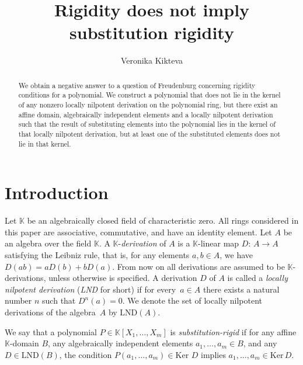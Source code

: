 \documentclass[12pt,reqno]{amsart}
\title{}
\author{Veronika Kikteva}
\newcommand{\KK}{\mathbb K}
\newcommand{\Ker}{\mathrm{Ker}\,}
\theoremstyle{plain}
\theoremstyle{remark}
\theoremstyle{definition}
\begin{document}
\title{Rigidity does not imply substitution rigidity}
\maketitle
\begin{abstract}
We obtain a negative answer to a question of Freudenburg concerning rigidity conditions for a polynomial. We construct a polynomial that does not lie in the kernel of any nonzero locally nilpotent derivation on the polynomial ring, but there exist an affine domain, algebraically independent elements and a locally nilpotent derivation such that the result of substituting elements into the polynomial lies in the kernel of that locally nilpotent derivation, but at least one of the substituted elements does not lie in that kernel.
\end{abstract}

\section{Introduction}
Let $\mathbb{K}$ be an algebraically closed field of characteristic zero. All rings considered in this paper are associative, commutative, and have an identity element. Let $A$ be an algebra over the field $\mathbb K$. A $\KK$-\textit{derivation} of $A$ is a $\KK$-linear map $D$: $A\to A$ satisfying the Leibniz rule, that is, for any elements $a,b\in A$, we have $D(ab)=aD(b)+bD(a)$. From now on all derivations are assumed to be $\KK$-derivations, unless otherwise is specified. A derivation $D$ of $A$ is called a \textit{locally nilpotent derivation} (\textit{LND} for short) if for every~$a\in A$ there exists a natural number $n$ such that $D ^n (a)=0$. We denote the set of locally nilpotent derivations of the algebra~$A$ by $\mathrm{LND}(A)$.

We say that a polynomial $P\in\mathbb{K}[X_1,\dots,X_m]$ is \textit{substitution-rigid} if for any affine $\mathbb{K}$-domain $B$, any algebraically independent elements $a_1,\dots,a_m\in B$, and any $D\in \mathrm{LND}(B)$, the condition $P(a_1,\dots,a_m)\in \Ker\,D$ implies
${a_1,\dots,a_m\in \Ker D}$.
\end{document}
